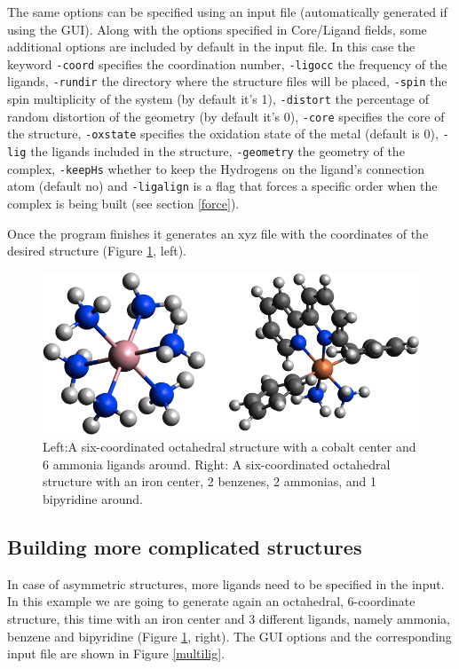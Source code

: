 \documentclass[a4paper,12pt]{assignment}
\begin{document}
The same options can be specified using an input file (automatically generated if using the GUI). Along with the options specified in Core/Ligand fields, some additional options are included by default in the input file. In this case the keyword \texttt{-coord} specifies the coordination number, \texttt{-ligocc} the frequency of the ligands, \texttt{-rundir} the directory where the structure files will be placed, \texttt{-spin} the spin multiplicity of the system (by default it's 1), \texttt{-distort} the percentage of random distortion of the geometry (by default it's 0), \texttt{-core} specifies the core of the structure, \texttt{-oxstate} specifies the oxidation state of the metal (default is 0), \texttt{-lig} the ligands included in the structure, \texttt{-geometry} the geometry of the complex, \texttt{-keepHs} whether to keep the Hydrogens on the ligand's connection atom (default no) and \texttt{-ligalign} is a flag that forces a specific order when the complex is being built (see section \ref{force}).

Once the program finishes it generates an xyz file with the coordinates of the desired structure (Figure \ref{genl}, left).


\begin{figure}[htb!]
\centering
\includegraphics[scale=0.5]{./Figures/figen.png}
\caption{Left:A six-coordinated octahedral structure with a cobalt center and 6 ammonia ligands around. Right: A six-coordinated octahedral structure with an iron center, 2 benzenes, 2 ammonias, and 1 bipyridine around.}
\label{genl}
\end{figure}

\subsection{Building more complicated structures}\label{compgen}

In case of asymmetric structures, more ligands need to be specified in the input. In this example we are going to generate again an octahedral, 6-coordinate structure, this time with an iron center and 3 different ligands, namely ammonia, benzene and bipyridine (Figure \ref{genl}, right). The GUI options and the corresponding input file are shown in Figure \ref{multilig}.
\end{document}
